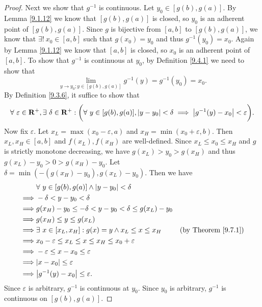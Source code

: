 \begin{proof}
    Next we show that \(g^{-1}\) is continuous.
    Let \(y_0 \in [g(b), g(a)]\).
    By Lemma \ref{9.1.12} we know that \([g(b), g(a)]\) is closed, so \(y_0\) is an adherent point of \([g(b), g(a)]\).
    Since \(g\) is bijective from \([a, b]\) to \([g(b), g(a)]\), we know that \(\exists!\ x_0 \in [a, b]\) such that \(g(x_0) = y_0\) and thus \(g^{-1}(y_0) = x_0\).
    Again by Lemma \ref{9.1.12} we know that \([a, b]\) is closed, so \(x_0\) is an adherent point of \([a, b]\).
    To show that \(g^{-1}\) is continuous at \(y_0\), by Definition \ref{9.4.1} we need to show that
    \[
        \lim_{y \to y_0 ; y \in [g(b), g(a)]} g^{-1}(y) = g^{-1}(y_0) = x_0.
    \]
    By Definition \ref{9.3.6}, it suffice to show that
    \[
        \forall\ \varepsilon \in \mathbf{R}^+, \exists\ \delta \in \mathbf{R}^+ : \bigg(\forall\ y \in [g(b), g(a)], \abs*{y - y_0} < \delta \implies \abs*{g^{-1}(y) - x_0} < \varepsilon\bigg).
    \]
    Now fix \(\varepsilon\).
    Let \(x_L = \max(x_0 - \varepsilon, a)\) and \(x_H = \min(x_0 + \varepsilon, b)\).
    Then \(x_L, x_H \in [a, b]\) and \(f(x_L), f(x_H)\) are well-defined.
    Since \(x_L \leq x_0 \leq x_H\) and \(g\) is strictly monotone decreasing, we have \(g(x_L) > y_0 > g(x_H)\) and thus \(g(x_L) - y_0 > 0 > g(x_H) - y_0\).
    Let \(\delta = \min(-(g(x_H) - y_0), g(x_L) - y_0)\).
    Then we have
    \begin{align*}
                 & \forall\ y \in [g(b), g(a)] \land \abs*{y - y_0} < \delta                                           \\
        \implies & -\delta < y - y_0 < \delta                                                                          \\
        \implies & g(x_H) - y_0 \leq -\delta < y - y_0 < \delta \leq g(x_L) - y_0                                      \\
        \implies & g(x_H) \leq y \leq g(x_L)                                                                           \\
        \implies & \exists\ x \in [x_L, x_H] : g(x) = y \land x_L \leq x \leq x_H    & \text{(by Theorem \ref{9.7.1})} \\
        \implies & x_0 - \varepsilon \leq x_L \leq x \leq x_H \leq x_0 + \varepsilon                                   \\
        \implies & -\varepsilon \leq x - x_0 \leq \varepsilon                                                          \\
        \implies & \abs*{x - x_0} \leq \varepsilon                                                                     \\
        \implies & \abs*{g^{-1}(y) - x_0} \leq \varepsilon.
    \end{align*}
    Since \(\varepsilon\) is arbitrary, \(g^{-1}\) is continuous at \(y_0\).
    Since \(y_0\) is arbitrary, \(g^{-1}\) is continuous on \([g(b), g(a)]\).


\end{proof}
